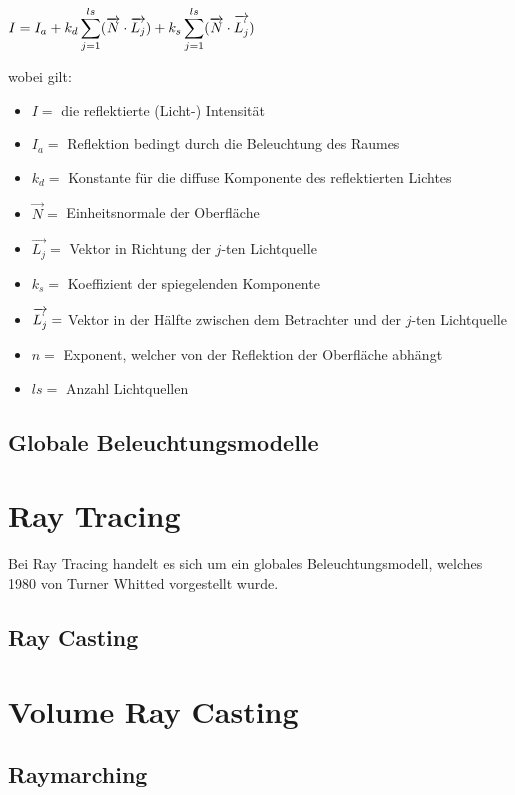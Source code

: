$ I = I_a + k_d \displaystyle\sum_{j=1}^{ls} (\overrightarrow{N} \cdot \overrightarrow{L_j}) + k_s \displaystyle\sum_{j=1}^{ls} (\overrightarrow{N} \cdot \overrightarrow{L_j^`} ) $

wobei gilt:

\begin{itemize}
    \item $I =$ die reflektierte (Licht-) Intensität
    \item $I_a =$ Reflektion bedingt durch die Beleuchtung des Raumes
    \item $k_d =$ Konstante für die diffuse Komponente des reflektierten Lichtes
    \item $\overrightarrow{N} =$ Einheitsnormale der Oberfläche
    \item $\overrightarrow{L_j} =$ Vektor in Richtung der $j$-ten Lichtquelle
    \item $k_s =$ Koeffizient der spiegelenden Komponente
    \item $\overrightarrow{L_j^`} =$ Vektor in der Hälfte zwischen dem Betrachter und der $j$-ten Lichtquelle
    \item $n =$ Exponent, welcher von der Reflektion der Oberfläche abhängt
    \item $ls = $ Anzahl Lichtquellen
\end{itemize}

\subsection{Globale Beleuchtungsmodelle}
\label{subsec:global_illumination_models}


\section{Ray Tracing}
\label{sec:ray_tracing}

Bei Ray Tracing handelt es sich um ein globales Beleuchtungsmodell, welches 1980 von Turner Whitted vorgestellt wurde.

\subsection{Ray Casting}
\label{subsec:ray_casting}


\section{Volume Ray Casting}
\label{sec:volume_ray_casting}


\subsection{Raymarching}
\label{subsec:raymarching}

